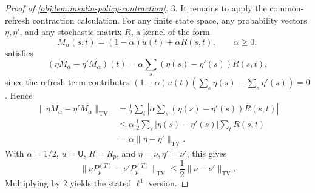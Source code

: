 \begin{proof}[Proof of \cref{obj:lem:insulin-policy-contraction}]
3. It remains to apply the common-refresh contraction calculation.  For any
finite state space, any probability vectors \(\eta,\eta'\), and any stochastic
matrix \(R\), a kernel of the form
\[
M_\alpha(s,t)=(1-\alpha)u(t)+\alpha R(s,t),
\qquad \alpha\ge 0,
\]
satisfies
\[
(\eta M_\alpha-\eta'M_\alpha)(t)
=
\alpha\sum_s(\eta(s)-\eta'(s))R(s,t),
\]
since the refresh term contributes
\((1-\alpha)u(t)(\sum_s\eta(s)-\sum_s\eta'(s))=0\).  Hence
\[
\begin{aligned}
\|\eta M_\alpha-\eta'M_\alpha\|_{\mathrm{TV}}
&=
\frac12\sum_t
\left|
\alpha\sum_s(\eta(s)-\eta'(s))R(s,t)
\right|  \\
&\le
\alpha\,\frac12\sum_s|\eta(s)-\eta'(s)|
        \sum_t R(s,t) \\
&=
\alpha\|\eta-\eta'\|_{\mathrm{TV}} .
\end{aligned}
\]
With \(\alpha=1/2\), \(u=\mathsf U\), \(R=R_p\), and
\(\eta=\nu,\eta'=\nu'\), this gives
\[
\|\nu P_p^{(T)}-\nu'P_p^{(T)}\|_{\mathrm{TV}}
\le
\frac12\|\nu-\nu'\|_{\mathrm{TV}} .
\]
Multiplying by \(2\) yields the stated \(\ell^1\) version.
\end{proof}
